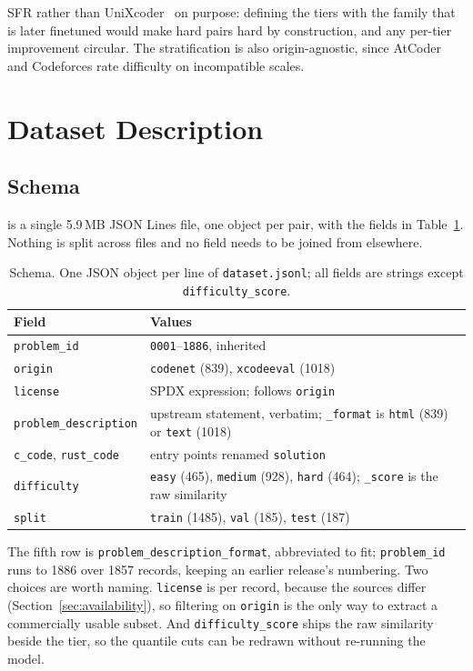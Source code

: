SFR rather than UniXcoder~\cite{guo2022unixcoder} on purpose: defining the
tiers with the family that is later finetuned would make hard pairs hard by
construction, and any per-tier improvement circular. The stratification is also
origin-agnostic, since AtCoder and Codeforces rate difficulty on incompatible
scales.

\section{Dataset Description}
\label{sec:description}

\subsection{Schema}

\dsname{} is a single 5.9\,MB JSON Lines file, one object per pair, with the
fields in Table~\ref{tab:schema}. Nothing is split across files and no field
needs to be joined from elsewhere.

\begin{table}[tbp]
\caption{Schema. One JSON object per line of \texttt{dataset.jsonl}; all
fields are strings except \texttt{difficulty\_score}.}
\label{tab:schema}
\centering
\footnotesize
\begin{tabular}{@{}l@{~~}p{4.3cm}@{}}
\toprule
Field & Values \\
\midrule
\texttt{problem\_id} & \texttt{0001}--\texttt{1886}, inherited \\
\texttt{origin} & \texttt{codenet} (839), \texttt{xcodeeval} (1018) \\
\texttt{license} & SPDX expression; follows \texttt{origin} \\
\texttt{problem\_description} & upstream statement, verbatim; \texttt{\_format} is
  \texttt{html} (839) or \texttt{text} (1018) \\
\texttt{c\_code}, \texttt{rust\_code} & entry points renamed \texttt{solution} \\
\texttt{difficulty} & \texttt{easy} (465), \texttt{medium} (928), \texttt{hard}
  (464); \texttt{\_score} is the raw similarity \\
\texttt{split} & \texttt{train} (1485), \texttt{val} (185), \texttt{test} (187) \\
\bottomrule
\end{tabular}
\end{table}

The fifth row is \texttt{problem\_description\_format}, abbreviated to
fit; \texttt{problem\_id} runs to 1886 over 1857 records, keeping an
earlier release's numbering. Two choices are worth naming. \texttt{license} is
per record, because the sources differ (Section~\ref{sec:availability}), so
filtering on \texttt{origin} is the only way to extract a commercially usable
subset. And \texttt{difficulty\_score} ships the raw similarity beside the
tier, so the quantile cuts can be redrawn without re-running the model.

